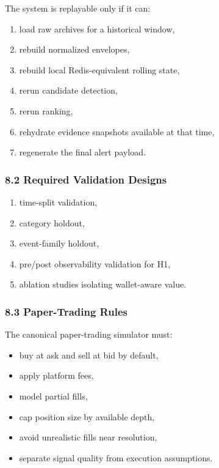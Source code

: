 \documentclass[
]{article}
\providecommand{\tightlist}{%
  \setlength{\itemsep}{0pt}\setlength{\parskip}{0pt}}
\begin{document}
The system is replayable only if it can:

\begin{enumerate}
\def\labelenumi{\arabic{enumi}.}
\tightlist
\item
  load raw archives for a historical window,
\item
  rebuild normalized envelopes,
\item
  rebuild local Redis-equivalent rolling state,
\item
  rerun candidate detection,
\item
  rerun ranking,
\item
  rehydrate evidence snapshots available at that time,
\item
  regenerate the final alert payload.
\end{enumerate}

\subsubsection{8.2 Required Validation
Designs}\label{82-required-validation-designs}

\begin{enumerate}
\def\labelenumi{\arabic{enumi}.}
\tightlist
\item
  time-split validation,
\item
  category holdout,
\item
  event-family holdout,
\item
  pre/post observability validation for H1,
\item
  ablation studies isolating wallet-aware value.
\end{enumerate}

\subsubsection{8.3 Paper-Trading Rules}\label{83-paper-trading-rules}

The canonical paper-trading simulator must:

\begin{itemize}
\tightlist
\item
  buy at ask and sell at bid by default,
\item
  apply platform fees,
\item
  model partial fills,
\item
  cap position size by available depth,
\item
  avoid unrealistic fills near resolution,
\item
  separate signal quality from execution assumptions.
\end{itemize}
\end{document}
